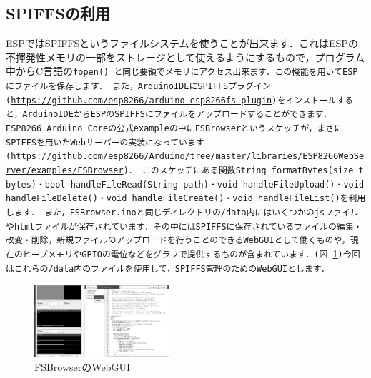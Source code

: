 \subsection{SPIFFSの利用}
ESPではSPIFFSというファイルシステムを使うことが出来ます．これはESPの不揮発性メモリの一部をストレージとして使えるようにするもので，プログラム中からC言語の\tt{fopen()}\rm{} と同じ要領でメモリにアクセス出来ます．この機能を用いてESPにファイルを保存します．
また，ArduinoIDEにSPIFFSプラグイン(\url{https://github.com/esp8266/arduino-esp8266fs-plugin})をインストールすると，ArduinoIDEからESPのSPIFFSにファイルをアップロードすることができます．
ESP8266 Arduino Coreの公式exampleの中にFSBrowserというスケッチが，まさにSPIFFSを用いたWebサーバーの実装になっています(\url{https://github.com/esp8266/Arduino/tree/master/libraries/ESP8266WebServer/examples/FSBrowser})．
このスケッチにある関数\tt{String formatBytes(size\_t bytes)}\rm{}・\tt{bool handleFileRead(String path)}\rm{}・\tt{void handleFileUpload()}\rm{}・\tt{void handleFileDelete()}\rm{}・\tt{void  handleFileCreate()}\rm{}・\tt{void  handleFileList()}\rm{}を利用します．
また，FSBrowser.inoと同じディレクトリの\tt{/data}\rm{}内にはいくつかのjsファイルやhtmlファイルが保存されています．その中にはSPIFFSに保存されているファイルの編集・改変・削除，新規ファイルのアップロードを行うことのできるWebGUIとして働くものや，現在のヒープメモリやGPIOの電位などをグラフで提供するものが含まれています．(図 \ref{fig:fsb})今回はこれらの\tt{/data}\rm{}内のファイルを使用して，SPIFFS管理のためのWebGUIとします．

\begin{figure}[htbp]
    \centering
    \includegraphics[width=50mm]{./assets/haibaraaaaaaaasset/FSBrowser.png}
    \caption{FSBrowserのWebGUI}
    \label{fig:fsb}
\end{figure}


